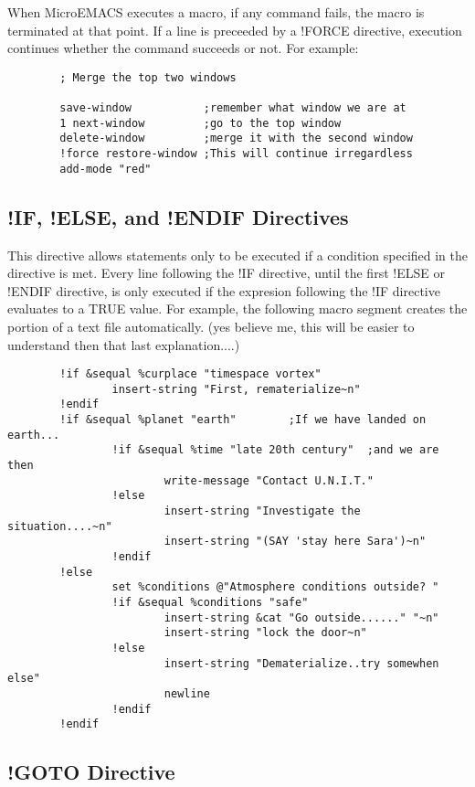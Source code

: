 When MicroEMACS executes a macro, if any command fails, the
macro is terminated at that point. If a line is preceeded by a !FORCE
directive, execution continues whether the command succeeds or not. For
example:

\begin{verbatim}
        ; Merge the top two windows

        save-window           ;remember what window we are at
        1 next-window         ;go to the top window
        delete-window         ;merge it with the second window
        !force restore-window ;This will continue irregardless
        add-mode "red"
\end{verbatim}

\subsection{!IF, !ELSE, and !ENDIF Directives}

This directive allows statements only to be executed if a
condition specified in the directive is met.  Every line following the
!IF directive, until the first !ELSE or !ENDIF directive, is only
executed if the expresion following the !IF directive evaluates to a
TRUE value.  For example, the following macro segment creates the
portion of a text file automatically.  (yes believe me, this will be
easier to understand then that last explanation....)

\begin{verbatim}
        !if &sequal %curplace "timespace vortex"
                insert-string "First, rematerialize~n"
        !endif
        !if &sequal %planet "earth"        ;If we have landed on earth...
                !if &sequal %time "late 20th century"  ;and we are then
                        write-message "Contact U.N.I.T."
                !else
                        insert-string "Investigate the situation....~n"
                        insert-string "(SAY 'stay here Sara')~n"
                !endif
        !else
                set %conditions @"Atmosphere conditions outside? "
                !if &sequal %conditions "safe"
                        insert-string &cat "Go outside......" "~n"
                        insert-string "lock the door~n"
                !else
                        insert-string "Dematerialize..try somewhen else"
                        newline
                !endif
        !endif
\end{verbatim}

\subsection{!GOTO Directive}

